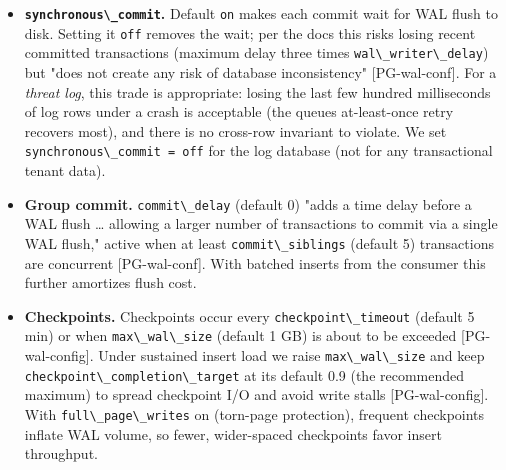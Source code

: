 \begin{itemize}
\tightlist
\item
  \textbf{\passthrough{\lstinline!synchronous\_commit!}.} Default
  \passthrough{\lstinline!on!} makes each commit wait for WAL flush to
  disk. Setting it \passthrough{\lstinline!off!} removes the wait; per
  the docs this risks losing recent committed transactions (maximum
  delay three times \passthrough{\lstinline!wal\_writer\_delay!}) but
  "does not create any risk of database inconsistency"
  {[}PG-wal-conf{]}. For a \emph{threat log}, this trade is appropriate:
  losing the last few hundred milliseconds of log rows under a crash is
  acceptable (the queue\textquotesingle s at-least-once retry recovers
  most), and there is no cross-row invariant to violate. We set
  \passthrough{\lstinline!synchronous\_commit = off!} for the log
  database (not for any transactional tenant data).
\item
  \textbf{Group commit.} \passthrough{\lstinline!commit\_delay!}
  (default 0) "adds a time delay before a WAL flush \ldots{} allowing a
  larger number of transactions to commit via a single WAL flush,"
  active when at least \passthrough{\lstinline!commit\_siblings!}
  (default 5) transactions are concurrent {[}PG-wal-conf{]}. With
  batched inserts from the consumer this further amortizes flush cost.
\item
  \textbf{Checkpoints.} Checkpoints occur every
  \passthrough{\lstinline!checkpoint\_timeout!} (default 5 min) or when
  \passthrough{\lstinline!max\_wal\_size!} (default 1 GB) is about to be
  exceeded {[}PG-wal-config{]}. Under sustained insert load we raise
  \passthrough{\lstinline!max\_wal\_size!} and keep
  \passthrough{\lstinline!checkpoint\_completion\_target!} at its
  default 0.9 (the recommended maximum) to spread checkpoint I/O and
  avoid write stalls {[}PG-wal-config{]}. With
  \passthrough{\lstinline!full\_page\_writes!} on (torn-page
  protection), frequent checkpoints inflate WAL volume, so fewer,
  wider-spaced checkpoints favor insert throughput.
\end{itemize}


